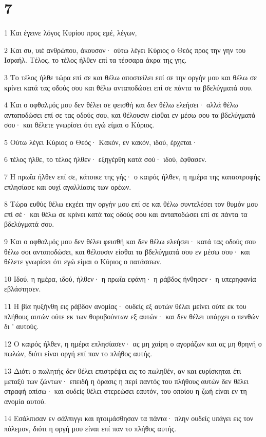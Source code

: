 \chapter{7}

\par 1 Και έγεινε λόγος Κυρίου προς εμέ, λέγων,
\par 2 Και συ, υιέ ανθρώπου, άκουσον· ούτω λέγει Κύριος ο Θεός προς την γην του Ισραήλ. Τέλος, το τέλος ήλθεν επί τα τέσσαρα άκρα της γης.
\par 3 Το τέλος ήλθε τώρα επί σε και θέλω αποστείλει επί σε την οργήν μου και θέλω σε κρίνει κατά τας οδούς σου και θέλω ανταποδώσει επί σε πάντα τα βδελύγματά σου.
\par 4 Και ο οφθαλμός μου δεν θέλει σε φεισθή και δεν θέλω ελεήσει· αλλά θέλω ανταποδώσει επί σε τας οδούς σου, και θέλουσιν είσθαι εν μέσω σου τα βδελύγματά σου· και θέλετε γνωρίσει ότι εγώ είμαι ο Κύριος.
\par 5 Ούτω λέγει Κύριος ο Θεός· Κακόν, εν κακόν, ιδού, έρχεται·
\par 6 τέλος ήλθε, το τέλος ήλθεν· εξηγέρθη κατά σού· ιδού, έφθασεν.
\par 7 Η πρωΐα ήλθεν επί σε, κάτοικε της γής· ο καιρός ήλθεν, η ημέρα της καταστροφής επλησίασε και ουχί αγαλλίασις των ορέων.
\par 8 Τώρα ευθύς θέλω εκχέει την οργήν μου επί σε και θέλω συντελέσει τον θυμόν μου επί σέ· και θέλω σε κρίνει κατά τας οδούς σου και ανταποδώσει επί σε πάντα τα βδελύγματά σου.
\par 9 Και ο οφθαλμός μου δεν θέλει φεισθή και δεν θέλω ελεήσει· κατά τας οδούς σου θέλω σοι ανταποδώσει, και θέλουσιν είσθαι τα βδελύγματά σου εν μέσω σου· και θέλετε γνωρίσει ότι εγώ είμαι ο Κύριος ο πατάσσων.
\par 10 Ιδού, η ημέρα, ιδού, ήλθεν· η πρωΐα εφάνη· η ράβδος ήνθησεν· η υπερηφανία εβλάστησεν.
\par 11 Η βία ηυξήνθη εις ράβδον ανομίας· ουδείς εξ αυτών θέλει μείνει ούτε εκ του πλήθους αυτών ούτε εκ των θορυβούντων εξ αυτών· και δεν θέλει υπάρχει ο πενθών δι ' αυτούς.
\par 12 Ο καιρός ήλθεν, η ημέρα επλησίασεν· ας μη χαίρη ο αγοράζων και ας μη θρηνή ο πωλών, διότι είναι οργή επί παν το πλήθος αυτής.
\par 13 Διότι ο πωλητής δεν θέλει επιστρέψει εις το πωληθέν, αν και ευρίσκηται έτι μεταξύ των ζώντων· επειδή η όρασις η περί παντός του πλήθους αυτών δεν θέλει στραφή οπίσω· και ουδείς θέλει στερεώσει εαυτόν, του οποίου η ζωή είναι εν τη ανομία αυτού.
\par 14 Εσάλπισαν εν σάλπιγγι και ητοιμάσθησαν τα πάντα· πλην ουδείς υπάγει εις τον πόλεμον, διότι η οργή μου είναι επί παν το πλήθος αυτής.
